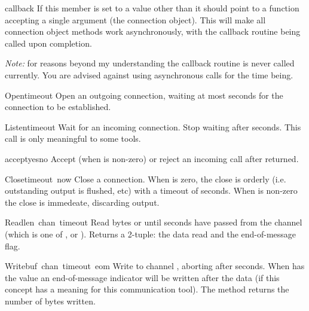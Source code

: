 \begin{datadesc}{callback}
If this member is set to a value other than  it should point
to a function accepting a single argument (the connection
object). This will make all connection object methods work
asynchronously, with the callback routine being called upon
completion.

{\em Note:} for reasons beyond my understanding the callback routine
is never called currently. You are advised against using asynchronous
calls for the time being.
\end{datadesc}


\begin{funcdesc}{Open}{timeout}
Open an outgoing connection, waiting at most  seconds for
the connection to be established.
\end{funcdesc}

\begin{funcdesc}{Listen}{timeout}
Wait for an incoming connection. Stop waiting after 
seconds. This call is only meaningful to some tools.
\end{funcdesc}

\begin{funcdesc}{accept}{yesno}
Accept (when  is non-zero) or reject an incoming call after
 returned.
\end{funcdesc}

\begin{funcdesc}{Close}{timeout\, now}
Close a connection. When  is zero, the close is orderly
(i.e. outstanding output is flushed, etc) with a timeout of
 seconds. When  is non-zero the close is
immedeate, discarding output.
\end{funcdesc}

\begin{funcdesc}{Read}{len\, chan\, timeout}
Read  bytes or until  seconds have passed from
the channel  (which is one of ,  or
). Returns a 2-tuple: the data read and the end-of-message
flag.
\end{funcdesc}

\begin{funcdesc}{Write}{buf\, chan\, timeout\, eom}
Write  to channel , aborting after 
seconds. When  has the value  an
end-of-message indicator will be written after the data (if this
concept has a meaning for this communication tool). The method returns
the number of bytes written.
\end{funcdesc}

